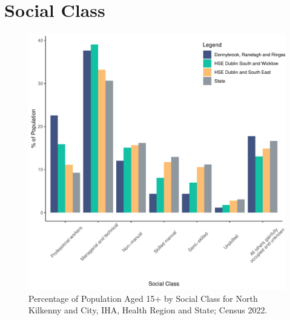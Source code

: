 \documentclass{article}
\begin{document}
\section{Social Class}\label{sect:SC}
\begin{figure}[H]
	\centering
	\includegraphics[width = 140mm]{../figures/SocialClassED.pdf}
	\caption{Percentage of Population Aged 15+ by Social Class for North Kilkenny and City, IHA, Health Region and State; Census 2022.}
	\label{fig:vbnv}
	\end{figure}
\end{document}
